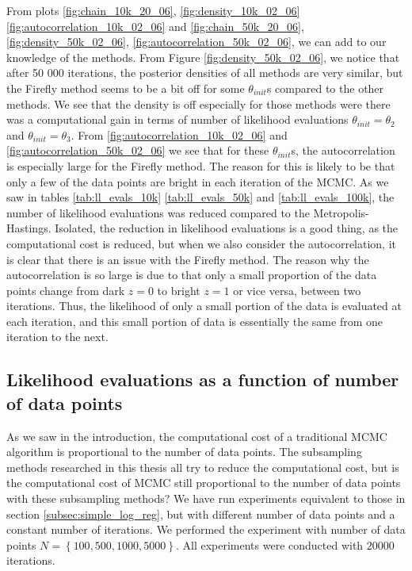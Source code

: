 From plots \ref{fig:chain_10k_20_06}, \ref{fig:density_10k_02_06} \ref{fig:autocorrelation_10k_02_06} and \ref{fig:chain_50k_20_06}, \ref{fig:density_50k_02_06}, \ref{fig:autocorrelation_50k_02_06}, we can add to our knowledge of the methods. 
From Figure \ref{fig:density_50k_02_06},  we  notice that after 50 000 iterations, the posterior densities of all methods are very similar, but the Firefly method seems to be a bit off for some $\theta_{init}$s compared to the other methods. We see that the density is off especially for those methods were there was a computational gain in terms of number of likelihood evaluations $\theta_{init} = \theta_2$ and $\theta_{init} = \theta_3$. From  \ref{fig:autocorrelation_10k_02_06} and \ref{fig:autocorrelation_50k_02_06} we see that for these $\theta_{init}$s, the autocorrelation is especially large for the Firefly method. 
The reason for this is likely to be that only a few of the data points are bright in each iteration of the MCMC. As we saw in tables \ref{tab:ll_evals_10k} \ref{tab:ll_evals_50k} and \ref{tab:ll_evals_100k}, the number of likelihood evaluations was reduced compared to the Metropolis-Hastings.
Isolated, the reduction in likelihood evaluations is a good thing, as the computational cost is reduced, but when we also consider the autocorrelation, it is clear that there is an issue with the Firefly method. 
The reason why the autocorrelation is so large is due to that only a small proportion of the data points change from dark $z = 0$ to bright $z = 1$ or vice versa, between two iterations. 
Thus, the likelihood of only a small portion of the data is evaluated at each iteration, and this small portion of data is essentially the same from one iteration to the next. 

\subsection{Likelihood evaluations as a function of number of data points}As we saw in the introduction, the computational cost of a traditional MCMC algorithm is proportional to the number of data points. 
The subsampling methods researched in this thesis all try to reduce the computational cost, but is the computational cost of MCMC still proportional to the number of data points with these subsampling methods? 
We have run experiments equivalent to those in section \ref{subsec:simple_log_reg}, but with different number of data points and a constant number of iterations. We performed the experiment with number of data points $N = \left\{100, 500, 1000, 5000\right\}$. All experiments were conducted with $20000$ iterations. 


